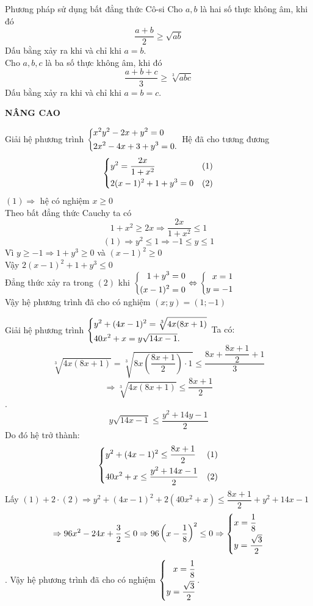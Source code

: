\begin{dang}{Phương pháp sử dụng bất đẳng thức Cô-si}
    Cho $a,b$ là hai số thực không âm, khi đó
$$\dfrac{a+b}{2} \geq \sqrt{ab}$$
Dấu bằng xảy ra khi và chỉ khi $a=b$.\\
Cho $a,b,c$ là ba số thực không âm, khi đó
$$\dfrac{a+b+c}{3} \geq \sqrt[3]{abc}$$
Dấu bằng xảy ra khi và chỉ khi $a=b=c$.
\end{dang}
\begin{center}
  \textbf{NÂNG CAO} 
  \end{center}
\begin{ex}%
Giải hệ phương trình $\left\{\begin{aligned}&x^2 y^2-2x+y^2=0 \\ &2x^2-4x+3+y^3=0.\end{aligned}\right.$
\loigiai
{Hệ đã cho tương đương 
$$\left\{\begin{aligned}&y^2=\dfrac{2x}{1+x^2} &(1)\\ &2(x-1)^2+1+y^3=0&(2)\end{aligned}\right.$$
$(1) \Rightarrow$ hệ có nghiệm $x \geq 0$\\
Theo bất đẳng thức Cauchy ta có
$$1+x^2 \geq 2x \Rightarrow \dfrac{2x}{1+x^2} \leq 1$$
$$(1) \Rightarrow y^2 \leq 1 \Rightarrow -1 \leq y \leq 1$$
Vì $y \geq -1 \Rightarrow 1+y^3 \geq 0$ và $(x-1)^2 \geq 0$\\
Vậy $2(x-1)^2+1+y^3 \leq 0$\\
Đẳng thức xảy ra trong $(2)$ khi $\left\{\begin{aligned}1+y^3 = 0 \\ (x-1)^2 = 0\end{aligned}\right. \Leftrightarrow \left\{\begin{aligned}x = 1\\y = -1\end{aligned}\right.$\\
Vậy hệ phương trình đã cho có nghiệm $(x;y)=(1;-1)$
}
\end{ex}
\begin{ex}%
Giải hệ phương trình $\left\{\begin{aligned}&y^2+(4x-1)^2=\sqrt[3]{4x(8x+1)}\\ &40x^2+x=y \sqrt{14x-1}.\end{aligned}\right.$
\loigiai
{
Ta có: $$\sqrt[3]{4x(8x+1)}=\sqrt[3]{8x(\dfrac{8x+1}{2})\cdot 1} \leq \dfrac{8x+\dfrac{8x+1}{2}+1}{3}$$
$$\Rightarrow \sqrt[3]{4x(8x+1)} \leq \dfrac{8x+1}{2}$$.
$$y\sqrt{14x-1} \leq \dfrac{y^2+14y-1}{2}$$
Do đó hệ trở thành:
$$\left\{\begin{aligned}&y^2+(4x-1)^2 \leq \dfrac{8x+1}{2} & (1)\\ &40x^2+x \leq \dfrac{y^2+14x-1}{2}&(2)\end{aligned}\right.$$
Lấy $(1)+2 \cdot (2) \Rightarrow y^2+(4x-1)^2+2(40x^2+x) \leq \dfrac{8x+1}{2}+y^2+14x-1$
$$\Rightarrow 96x^2-24x+\dfrac{3}{2} \leq 0 \Rightarrow 96 \left( x- \dfrac{1}{8} \right)^2 \leq 0 \Rightarrow \left\{\begin{aligned}&x= \dfrac{1}{8}\\ &y= \dfrac{\sqrt{3}}{2}\end{aligned}\right.$$.
Vậy hệ phương trình đã cho có nghiệm $\left\{\begin{aligned}x= \dfrac{1}{8}\\ y= \dfrac{\sqrt{3}}{2}\end{aligned}\right.$.
}
\end{ex}

